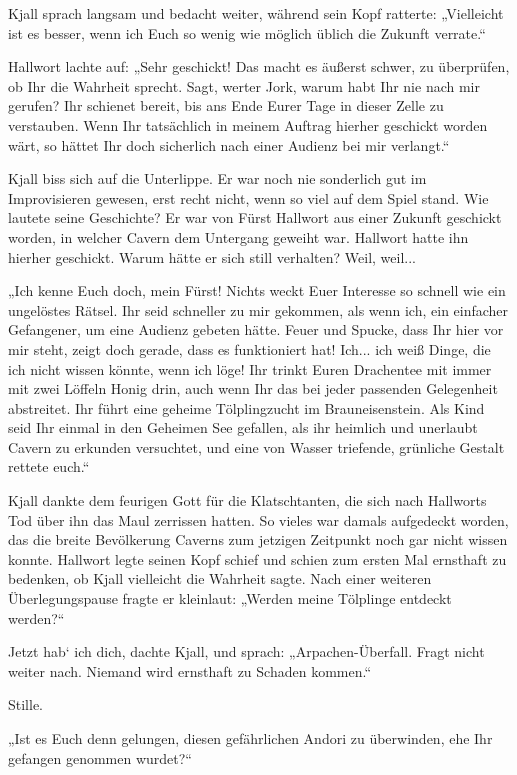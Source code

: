 Kjall sprach langsam und bedacht weiter, während sein Kopf ratterte: „Vielleicht ist es besser, wenn ich Euch so wenig wie möglich üblich die Zukunft verrate.“

Hallwort lachte auf: „Sehr geschickt! Das macht es äußerst schwer, zu überprüfen, ob Ihr die Wahrheit sprecht. Sagt, werter Jork, warum habt Ihr nie nach mir gerufen? Ihr schienet bereit, bis ans Ende Eurer Tage in dieser Zelle zu verstauben. Wenn Ihr tatsächlich in meinem Auftrag hierher geschickt worden wärt, so hättet Ihr doch sicherlich nach einer Audienz bei mir verlangt.“

Kjall biss sich auf die Unterlippe. Er war noch nie sonderlich gut im Improvisieren gewesen, erst recht nicht, wenn so viel auf dem Spiel stand. Wie lautete seine Geschichte? Er war von Fürst Hallwort aus einer Zukunft geschickt worden, in welcher Cavern dem Untergang geweiht war. Hallwort hatte ihn hierher geschickt. Warum hätte er sich still verhalten? Weil, weil...

„Ich kenne Euch doch, mein Fürst! Nichts weckt Euer Interesse so schnell wie ein ungelöstes Rätsel. Ihr seid schneller zu mir gekommen, als wenn ich, ein einfacher Gefangener, um eine Audienz gebeten hätte. Feuer und Spucke, dass Ihr hier vor mir steht, zeigt doch gerade, dass es funktioniert hat! Ich... ich weiß Dinge, die ich nicht wissen könnte, wenn ich löge! Ihr trinkt Euren Drachentee mit immer mit zwei Löffeln Honig drin, auch wenn Ihr das bei jeder passenden Gelegenheit abstreitet. Ihr führt eine geheime Tölplingzucht im Brauneisenstein. Als Kind seid Ihr einmal in den Geheimen See gefallen, als ihr heimlich und unerlaubt Cavern zu erkunden versuchtet, und eine von Wasser triefende, grünliche Gestalt rettete euch.“

Kjall dankte dem feurigen Gott für die Klatschtanten, die sich nach Hallworts Tod über ihn das Maul zerrissen hatten. So vieles war damals aufgedeckt worden, das die breite Bevölkerung Caverns zum jetzigen Zeitpunkt noch gar nicht wissen konnte. Hallwort legte seinen Kopf schief und schien zum ersten Mal ernsthaft zu bedenken, ob Kjall vielleicht die Wahrheit sagte. Nach einer weiteren Überlegungspause fragte er kleinlaut: „Werden meine Tölplinge entdeckt werden?“

Jetzt hab‘ ich dich, dachte Kjall, und sprach: „Arpachen-Überfall. Fragt nicht weiter nach. Niemand wird ernsthaft zu Schaden kommen.“

Stille.

„Ist es Euch denn gelungen, diesen gefährlichen Andori zu überwinden, ehe Ihr gefangen genommen wurdet?“

